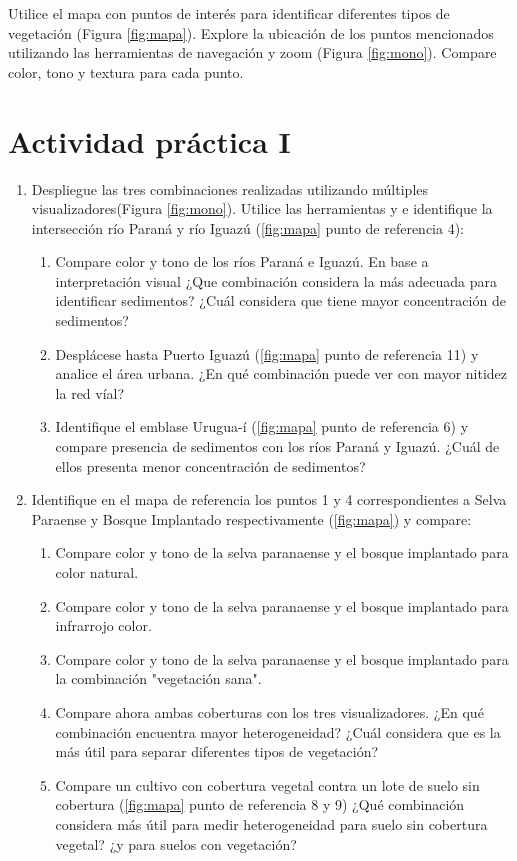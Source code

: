 Utilice el mapa con puntos de interés para identificar diferentes tipos de vegetación (Figura \ref{fig:mapa}). Explore la ubicación de los puntos mencionados utilizando las herramientas de navegación y zoom  (Figura \ref{fig:mono}). Compare color, tono y textura para cada punto.

\section{Actividad práctica I}

\begin{enumerate}
  \item Despliegue las tres combinaciones realizadas utilizando múltiples visualizadores(Figura \ref{fig:mono}). Utilice las herramientas  y  e identifique la intersección río Paraná y río Iguazú (\ref{fig:mapa} punto de referencia 4):
  \begin{enumerate}
    \item Compare color y tono de los ríos Paraná e Iguazú. En base a interpretación visual ¿Que combinación considera la más adecuada para identificar sedimentos? ¿Cuál  considera que tiene mayor concentración de sedimentos?
        \item  Desplácese hasta Puerto Iguazú (\ref{fig:mapa} punto de referencia 11) y analice el área urbana. ¿En qué combinación puede ver con mayor nitidez la red víal?
          \item  Identifique el emblase Urugua-í (\ref{fig:mapa} punto de referencia 6) y compare presencia de sedimentos con los ríos Paraná y Iguazú. ¿Cuál de ellos presenta menor concentración de sedimentos?

  \end{enumerate}

  \item Identifique en el mapa de referencia los puntos                       1 y 4 correspondientes a Selva Paraense y Bosque Implantado respectivamente (\ref{fig:mapa}) y compare:
  \begin{enumerate}
    \item  Compare color y tono de la selva paranaense y el bosque implantado para color natural.
     \item  Compare color y tono de la selva paranaense y el bosque implantado para infrarrojo color.
      \item  Compare color y tono de la selva paranaense y el bosque implantado para la combinación "vegetación sana".
    \item Compare ahora ambas coberturas con los tres visualizadores. ¿En qué combinación encuentra mayor heterogeneidad? ¿Cuál considera que es la más útil para separar diferentes tipos de vegetación?
     \item Compare un cultivo con cobertura vegetal contra un lote de suelo sin cobertura (\ref{fig:mapa} punto de referencia 8 y 9) ¿Qué combinación considera más útil para medir heterogeneidad para suelo sin cobertura vegetal? ¿y para suelos con vegetación?
  \end{enumerate}
  \end{enumerate}

